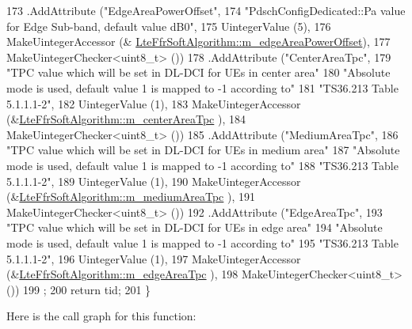 \begin{DoxyCode}
173     .AddAttribute (\textcolor{stringliteral}{"EdgeAreaPowerOffset"},
174                    \textcolor{stringliteral}{"PdschConfigDedicated::Pa value for Edge Sub-band, default value dB0"},
175                    UintegerValue (5),
176                    MakeUintegerAccessor (&
      \hyperlink{classns3_1_1LteFfrSoftAlgorithm_a5bfcbf15084a9fc8eaffb87b9df11c89}{LteFfrSoftAlgorithm::m\_edgeAreaPowerOffset}),
177                    MakeUintegerChecker<uint8\_t> ())
178     .AddAttribute (\textcolor{stringliteral}{"CenterAreaTpc"},
179                    \textcolor{stringliteral}{"TPC value which will be set in DL-DCI for UEs in center area"}
180                    \textcolor{stringliteral}{"Absolute mode is used, default value 1 is mapped to -1 according to"}
181                    \textcolor{stringliteral}{"TS36.213 Table 5.1.1.1-2"},
182                    UintegerValue (1),
183                    MakeUintegerAccessor (&\hyperlink{classns3_1_1LteFfrSoftAlgorithm_a2603343b6e59edefa75a47b40f1d2122}{LteFfrSoftAlgorithm::m\_centerAreaTpc}
      ),
184                    MakeUintegerChecker<uint8\_t> ())
185     .AddAttribute (\textcolor{stringliteral}{"MediumAreaTpc"},
186                    \textcolor{stringliteral}{"TPC value which will be set in DL-DCI for UEs in medium area"}
187                    \textcolor{stringliteral}{"Absolute mode is used, default value 1 is mapped to -1 according to"}
188                    \textcolor{stringliteral}{"TS36.213 Table 5.1.1.1-2"},
189                    UintegerValue (1),
190                    MakeUintegerAccessor (&\hyperlink{classns3_1_1LteFfrSoftAlgorithm_a6e77e31e179ddde74613832daf3ca87b}{LteFfrSoftAlgorithm::m\_mediumAreaTpc}
      ),
191                    MakeUintegerChecker<uint8\_t> ())
192     .AddAttribute (\textcolor{stringliteral}{"EdgeAreaTpc"},
193                    \textcolor{stringliteral}{"TPC value which will be set in DL-DCI for UEs in edge area"}
194                    \textcolor{stringliteral}{"Absolute mode is used, default value 1 is mapped to -1 according to"}
195                    \textcolor{stringliteral}{"TS36.213 Table 5.1.1.1-2"},
196                    UintegerValue (1),
197                    MakeUintegerAccessor (&\hyperlink{classns3_1_1LteFfrSoftAlgorithm_aeec11300e4db685b334e594e009d20fd}{LteFfrSoftAlgorithm::m\_edgeAreaTpc}
      ),
198                    MakeUintegerChecker<uint8\_t> ())
199   ;
200   \textcolor{keywordflow}{return} tid;
201 \}
\end{DoxyCode}


Here is the call graph for this function\+:


